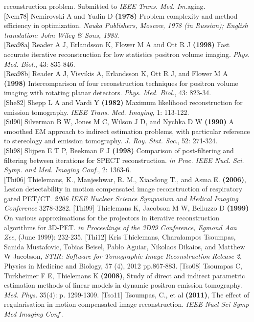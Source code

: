 \documentclass{article}
\begin{document}
reconstruction problem. Submitted to \textit{IEEE Trans. Med. Im.}aging.\\
{[}Nem78{]} Nemirovski A and Yudin D \textbf{(1978)} Problem complexity 
and method efficiency in optimization. \textit{Nauka Publishers, 
Moscow, 1978 (in Russian); English translation: John Wiley \& 
Sons, 1983}.\\
{[}Rea98a{]} Reader A J, Erlandsson K, Flower M A and Ott R J \textbf{(1998)} 
Fast accurate iterative reconstruction for low statistics positron 
volume imaging. \textit{Phys. Med. Biol.}, 43: 835-846.\\
{[}Rea98b{]} Reader A J, Visvikis A, Erlandsson K, Ott R J, and Flower 
M A \textbf{(1998)} Intercomparison of four reconstruction techniques 
for positron volume imaging with rotating planar detectors. \textit{Phys. 
Med. Biol.}, 43: 823-34.\\
{[}She82{]} Shepp L A and Vardi Y \textbf{(1982)} Maximum likelihood reconstruction 
for emission tomography. \textit{IEEE Trans. Med. Imaging}, 1: 113-122.\\
{[}Sil90{]} Silverman B W, Jones M C, Wilson J D, and Nychka D W \textbf{(1990)} 
A smoothed EM approach to indirect estimation problems, with 
particular reference to stereology and emission tomography. \textit{J. 
Roy. Stat. Soc}., 52: 271-324.\\
{[}Sli98{]} Slijpen E T P, Beekman F J \textbf{(1998)} Comparison of post-filtering 
and filtering between iterations for SPECT reconstruction. \textit{in 
Proc. IEEE Nucl. Sci. Symp. and Med. Imaging Conf.}, 2: 1363-6.\\
{[}Thi06{]} Thielemans, K., Manjeshwar, R. M., Xiaodong T., and Asma E.
\textbf{(2006)}, Lesion detectability in motion compensated
image reconstruction of respiratory gated PET/CT. \textit { 2006 IEEE
Nuclear Science Symposium and Medical Imaging Conference} 3278-3282.
{[}Thi99{]} Thielemans K, Jacobson M W, Belluzzo D \textbf{(1999)} On 
various approximations for the projectors in iterative reconstruction 
algorithms for 3D-PET. \textit{in Proceedings of the 3D99 Conference, 
Egmond Aan Zee}, (June 1999): 232-235.
[Thi12] Kris Thielemans, Charalampos Tsoumpas, Sanida Mustafovic, Tobias Beisel, Pablo Aguiar, Nikolaos Dikaios, and Matthew W Jacobson,
\textit{STIR: Software for Tomographic Image Reconstruction Release 2},
Physics in Medicine and Biology, 57 (4), 2012 pp.867-883.
{[}Tso08{]} Tsoumpas C, Turkheimer F E, Thielemans K \textbf{(2008)},
Study of direct and indirect parametric estimation methods of linear
models in dynamic positron emission tomography. \textit{Med. Phys.} 35(4):
p. 1299-1309.
{[}Tso11{]} Tsoumpas, C., et al \textbf{(2011)}, The effect of
regularisation in motion compensated image reconstruction. \textit { IEEE
Nucl Sci Symp Med Imaging Conf }.
\end{document}

